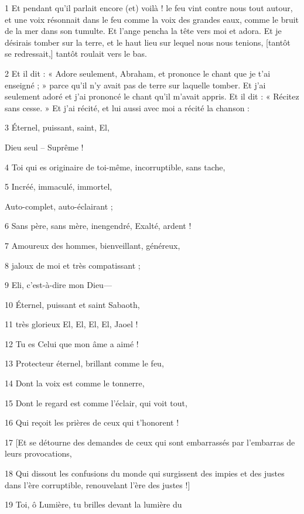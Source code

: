 \par 1 Et pendant qu'il parlait encore (et) voilà ! le feu vint contre nous tout autour, et une voix résonnait dans le feu comme la voix des grandes eaux, comme le bruit de la mer dans son tumulte. Et l'ange pencha la tête vers moi et adora. Et je désirais tomber sur la terre, et le haut lieu sur lequel nous nous tenions, [tantôt se redressait,] tantôt roulait vers le bas.

\par 2 Et il dit : « Adore seulement, Abraham, et prononce le chant que je t'ai enseigné ; » parce qu'il n'y avait pas de terre sur laquelle tomber. Et j'ai seulement adoré et j'ai prononcé le chant qu'il m'avait appris. Et il dit : « Récitez sans cesse. » Et j'ai récité, et lui aussi avec moi a récité la chanson :

\par 3 Éternel, puissant, saint, El,
\par     Dieu seul – Suprême !
\par 4 Toi qui es originaire de toi-même, incorruptible, sans tache,
\par 5 Incréé, immaculé, immortel,
\par     Auto-complet, auto-éclairant ;
\par 6 Sans père, sans mère, inengendré, Exalté, ardent !
\par 7 Amoureux des hommes, bienveillant, généreux,
\par 8 jaloux de moi et très compatissant ;
\par 9 Eli, c'est-à-dire mon Dieu—
\par 10 Éternel, puissant et saint Sabaoth,
\par 11 très glorieux El, El, El, El, Jaoel !
\par 12 Tu es Celui que mon âme a aimé !
\par 13 Protecteur éternel, brillant comme le feu,
\par 14 Dont la voix est comme le tonnerre,
\par 15 Dont le regard est comme l'éclair, qui voit tout,
\par 16 Qui reçoit les prières de ceux qui t'honorent !
\par 17 [Et se détourne des demandes de ceux qui sont embarrassés par l'embarras de leurs provocations,
\par 18 Qui dissout les confusions du monde qui surgissent des impies et des justes dans l'ère corruptible, renouvelant l'ère des justes !]
\par 19 Toi, ô Lumière, tu brilles devant la lumière du

